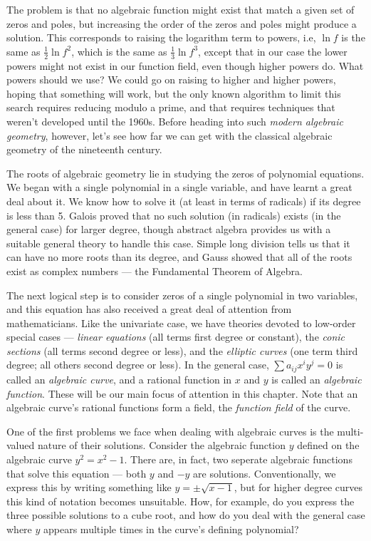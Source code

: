 The problem is that no algebraic function might exist that match a
given set of zeros and poles, but increasing the order of the zeros
and poles might produce a solution.  This corresponds to raising the
logarithm term to powers, i.e, $\ln f$ is the same as $\frac{1}{2} \ln
f^2$, which is the same as $\frac{1}{3} \ln f^3$, except that in our
case the lower powers might not exist in our function field, even
though higher powers do.  What powers should we use?  We could go on
raising to higher and higher powers, hoping that something will work,
but the only known algorithm to limit this search requires reducing
modulo a prime, and that requires techniques that weren't developed
until the 1960s.  Before heading into such {\it modern algebraic
geometry}, however, let's see how far we can get with the classical
algebraic geometry of the nineteenth century.


The roots of algebraic geometry lie in studying the zeros of
polynomial equations.  We began with a single polynomial in a single
variable, and have learnt a great deal about it.  We know how to solve
it (at least in terms of radicals) if its degree is less than 5.
Galois proved that no such solution (in radicals) exists (in the
general case) for larger degree, though abstract algebra provides us
with a suitable general theory to handle this case.  Simple long
division tells us that it can have no more roots than its degree, and
Gauss showed that all of the roots exist as complex numbers --- the
Fundamental Theorem of Algebra.

The next logical step is to consider zeros of a single polynomial in
two variables, and this equation has also received a great deal of
attention from mathematicians.  Like the univariate case, we have
theories devoted to low-order special cases --- {\it linear equations}
(all terms first degree or constant), the {\it conic sections} (all
terms second degree or less), and the {\it elliptic curves} (one term
third degree; all others second degree or less).  In the general case,
$\sum a_{ij} x^i y^j = 0$ is called an {\it algebraic curve}, and a
rational function in $x$ and $y$ is called an {\it algebraic
function}.  These will be our main focus of attention in this chapter.
Note that an algebraic curve's rational functions form a field, the
{\it function field} of the curve.

One of the first problems we face when dealing with algebraic curves
is the multi-valued nature of their solutions.  Consider the algebraic
function $y$ defined on the algebraic curve $y^2 = x^2 - 1$.  There
are, in fact, two seperate algebraic functions that solve this
equation --- both $y$ and $-y$ are solutions.  Conventionally, we
express this by writing something like $y = \pm\sqrt{x-1}$, but for
higher degree curves this kind of notation becomes unsuitable.  How,
for example, do you express the three possible solutions to a cube
root, and how do you deal with the general case where $y$ appears
multiple times in the curve's defining polynomial?

